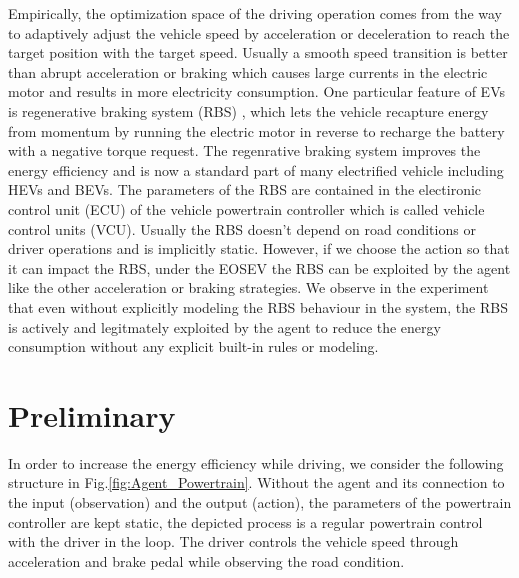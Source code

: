 \documentclass[conference]{IEEEtran}
\begin{document}
Empirically, the optimization space of the driving operation comes from the way to adaptively adjust the vehicle speed by acceleration or deceleration to reach the target position with the target speed. Usually a smooth speed transition is better than abrupt acceleration or braking which causes large currents in the electric motor and results in more electricity consumption. One particular feature of EVs is regenerative braking system (RBS) \parencite{Yang_2024_RBS}, which lets the vehicle recapture energy from momentum by running the electric motor in reverse to recharge the battery with a negative torque request. The regenrative braking system improves the energy efficiency and is now a standard part of many electrified vehicle including HEVs and BEVs. The parameters of the RBS are contained in the electironic control unit (ECU) of the vehicle powertrain controller which is called vehicle control units (VCU). Usually the RBS doesn't depend on road conditions or driver operations and is implicitly static. However, if we choose the action so that it can impact the RBS, under the EOSEV the RBS can be exploited by the agent like the other acceleration or braking strategies. We observe in the experiment that even without explicitly modeling the RBS behaviour in the system, the RBS is actively and legitmately exploited by the agent to reduce the energy consumption without any explicit built-in rules or modeling.

\section{Preliminary}\label{sec:intro:preliminary}

In order to increase the energy efficiency while driving, we consider the following structure in Fig.\@\ref{fig:Agent_Powertrain}. Without the agent and its connection to the input (observation) and the output (action), the parameters of the powertrain controller are kept static, the depicted process is a regular powertrain control with the driver in the loop. The driver controls the vehicle speed through acceleration and brake pedal while observing the road condition.

\end{document}
